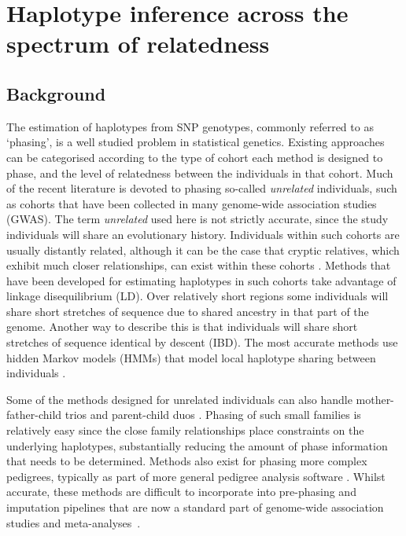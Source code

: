 
\chapter{Haplotype inference across the spectrum of relatedness}

\section{Background}
The estimation of haplotypes from SNP genotypes, commonly referred to as `phasing', is a well studied problem in statistical genetics. Existing approaches can be categorised according to the type of cohort each method is designed to phase, and the level of relatedness between the individuals in that cohort. Much of the recent literature is devoted to phasing so-called \emph{unrelated} individuals, such as cohorts that have been collected in many genome-wide association studies (GWAS). The term \emph{unrelated} used here is not strictly accurate, since the study individuals will share an evolutionary history. Individuals within such cohorts are usually distantly related, although it can be the case that cryptic relatives, which exhibit much closer relationships, can exist within these cohorts \citep{voight2005confounding}. Methods that have been developed for estimating haplotypes in such cohorts take advantage of linkage disequilibrium (LD). Over relatively short regions some individuals will share short stretches of sequence due to shared ancestry in that part of the genome. Another way to describe this is that individuals will share short stretches of sequence identical by descent (IBD). The most accurate methods use hidden Markov models (HMMs) that model local haplotype sharing between individuals \citep{stephens2001new, delaneau2013}.

Some of the methods designed for unrelated individuals can also handle mother-father-child trios and parent-child duos  \citep{marchini2006comparison, browning2009unified,delaneau2011linear,delaneau2013, williams2012phasing}. Phasing of such small families is relatively easy since the close family relationships place constraints on the underlying haplotypes, substantially reducing the amount of phase information that needs to be determined. Methods also exist for phasing more complex pedigrees, typically as part of more general pedigree analysis software \citep{lange2013mendel,sobel1996descent,abecasis2002merlin,gudbjartsson2000allegro}.  Whilst accurate, these methods are difficult to incorporate into pre-phasing and imputation pipelines that are now a standard part of genome-wide association studies and meta-analyses~\citep{howie2012fast}. 

